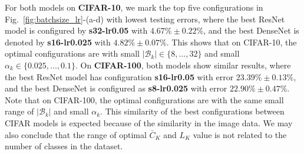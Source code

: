 \documentclass[10pt,journal,compsoc]{IEEEtran}
\begin{document}
For both models on {\bf CIFAR-10}, we mark the top five configurations in Fig.~\ref{fig:batchsize_lr}-(a-d) with lowest testing errors, where the best ResNet model is configured by {\bf s32-lr0.05} with $4.67\%\pm0.22\%$, and the best DenseNet is denoted by {\bf s16-lr0.025} with $4.82\%\pm0.07\%$.
This shows that on CIFAR-10, the optimal configurations are with small $|\mathcal{B}_k| \in \{ 8, ..., 32 \}$ and small $\alpha_k \in \{ 0.025, ..., 0.1 \}$.
On {\bf CIFAR-100}, both models show similar results, where the best ResNet model has configuration {\bf s16-lr0.05} with error $23.39\% \pm 0.13\%$, and the best DenseNet is configured as {\bf s8-lr0.025} with error $22.90\% \pm 0.47\%$. 
Note that on CIFAR-100, the optimal configurations are with the same small range of $|\mathcal{B}_k|$ and small $\alpha_k$.
This similarity of the best configurations between CIFAR models is expected because of the similarity in the image data.
We may also conclude that the range of optimal $\bar{C}_K$ and $L_K$ value is not related to the number of classes in the dataset.
\end{document}
